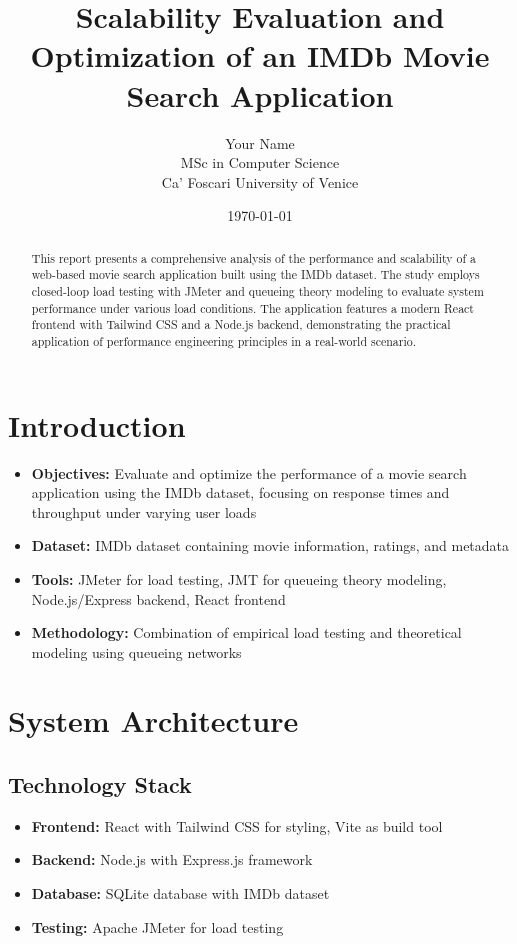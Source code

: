 \documentclass[12pt]{article}
\title{Scalability Evaluation and Optimization of an IMDb Movie Search Application}
\author{Your Name \\ MSc in Computer Science \\ Ca' Foscari University of Venice}
\date{\today}
\begin{document}
\maketitle

\begin{abstract}
This report presents a comprehensive analysis of the performance and scalability of a web-based movie search application built using the IMDb dataset. The study employs closed-loop load testing with JMeter and queueing theory modeling to evaluate system performance under various load conditions. The application features a modern React frontend with Tailwind CSS and a Node.js backend, demonstrating the practical application of performance engineering principles in a real-world scenario.
\end{abstract}

\tableofcontents
\newpage

\section{Introduction}
\begin{itemize}
    \item \textbf{Objectives:} Evaluate and optimize the performance of a movie search application using the IMDb dataset, focusing on response times and throughput under varying user loads
    \item \textbf{Dataset:} IMDb dataset containing movie information, ratings, and metadata
    \item \textbf{Tools:} JMeter for load testing, JMT for queueing theory modeling, Node.js/Express backend, React frontend
    \item \textbf{Methodology:} Combination of empirical load testing and theoretical modeling using queueing networks
\end{itemize}

\section{System Architecture}
\subsection{Technology Stack}
\begin{itemize}
    \item \textbf{Frontend:} React with Tailwind CSS for styling, Vite as build tool
    \item \textbf{Backend:} Node.js with Express.js framework
    \item \textbf{Database:} SQLite database with IMDb dataset
    \item \textbf{Testing:} Apache JMeter for load testing
\end{itemize}
\end{document}
